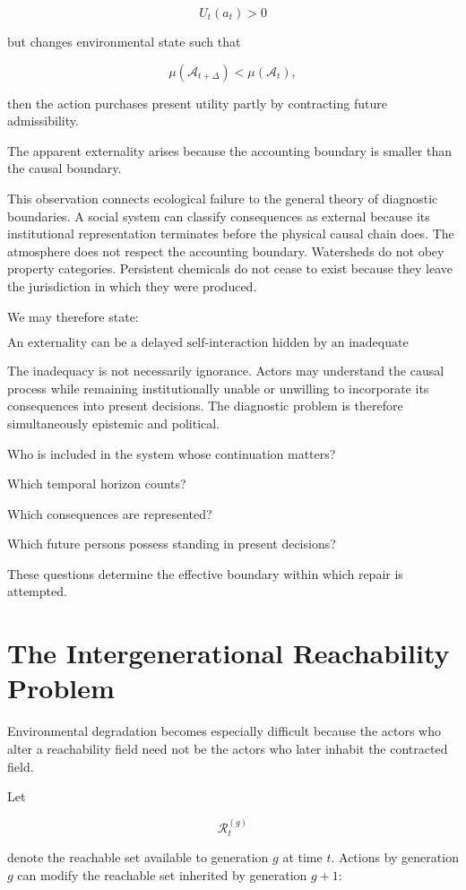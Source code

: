 \documentclass[11pt,oneside]{book}
\theoremstyle{definition}
\theoremstyle{remark}
\newcommand{\A}{\mathcal{A}}
\newcommand{\R}{\mathcal{R}}
\begin{document}
\[
U_t(a_t)>0
\]

but changes environmental state such that

\[
\mu(\A_{t+\Delta})<
\mu(\A_t),
\]

then the action purchases present utility partly by contracting future admissibility.

The apparent externality arises because the accounting boundary is smaller than the causal boundary.

This observation connects ecological failure to the general theory of diagnostic boundaries. A social system can classify consequences as external because its institutional representation terminates before the physical causal chain does. The atmosphere does not respect the accounting boundary. Watersheds do not obey property categories. Persistent chemicals do not cease to exist because they leave the jurisdiction in which they were produced.

We may therefore state:

\[
\boxed{
\text{An externality can be a delayed self-interaction hidden by an inadequate boundary.}
}
\]

The inadequacy is not necessarily ignorance. Actors may understand the causal process while remaining institutionally unable or unwilling to incorporate its consequences into present decisions. The diagnostic problem is therefore simultaneously epistemic and political.

Who is included in the system whose continuation matters?

Which temporal horizon counts?

Which consequences are represented?

Which future persons possess standing in present decisions?

These questions determine the effective boundary within which repair is attempted.

\section{The Intergenerational Reachability Problem}

Environmental degradation becomes especially difficult because the actors who alter a reachability field need not be the actors who later inhabit the contracted field.

Let

\[
\R_t^{(g)}
\]

denote the reachable set available to generation \(g\) at time \(t\). Actions by generation \(g\) can modify the reachable set inherited by generation \(g+1\):
\end{document}
